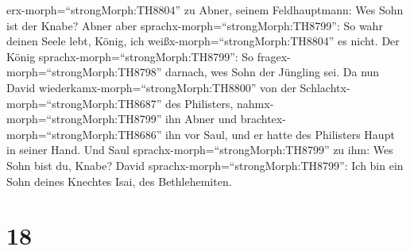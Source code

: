 erx-morph=``strongMorph:TH8804'' zu Abner, seinem Feldhauptmann: Wes
Sohn ist der Knabe? Abner aber sprachx-morph=``strongMorph:TH8799'': So
wahr deinen Seele lebt, König, ich weißx-morph=``strongMorph:TH8804'' es
nicht.  Der König sprachx-morph=``strongMorph:TH8799'': So
fragex-morph=``strongMorph:TH8798'' darnach, wes Sohn der Jüngling sei.
 Da nun David wiederkamx-morph=``strongMorph:TH8800'' von
der Schlachtx-morph=``strongMorph:TH8687'' des Philisters,
nahmx-morph=``strongMorph:TH8799'' ihn Abner und
brachtex-morph=``strongMorph:TH8686'' ihn vor Saul, und er hatte des
Philisters Haupt in seiner Hand.  Und Saul
sprachx-morph=``strongMorph:TH8799'' zu ihm: Wes Sohn bist du, Knabe?
David sprachx-morph=``strongMorph:TH8799'': Ich bin ein Sohn deines
Knechtes Isai, des Bethlehemiten.

\hypertarget{section-17}{%
\section{18}\label{section-17}}

